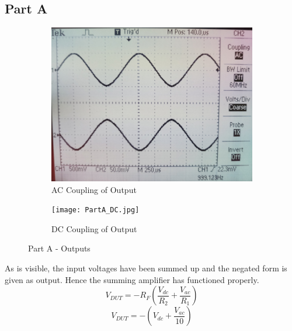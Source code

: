 \documentclass[12pt]{article}
\begin{document}
\subsection{Part A}
\begin{figure}[H]
	\begin{subfigure}[b]{0.5\linewidth}
		\centering
		\includegraphics[width = \linewidth]{PartA_AC.jpg}
		\caption{AC Coupling of Output}
	\end{subfigure}
	\begin{subfigure}[b]{0.5\linewidth}
		\centering
		\texttt{[image: PartA\_DC.jpg]}
		\caption{DC Coupling of Output}
	\end{subfigure}
	\caption{Part A - Outputs}
\end{figure}
As is visible, the input voltages have been summed up and the negated form is given as output. Hence the summing amplifier has functioned properly.
\[ V_{DUT} = -R_F \left( \frac{V_{dc}}{R_2} + \frac{V_{ac}}{R_1} \right) \] \[ V_{DUT} = - \left( V_{dc} + \frac{V_{ac}}{10} \right) \]
\end{document}
